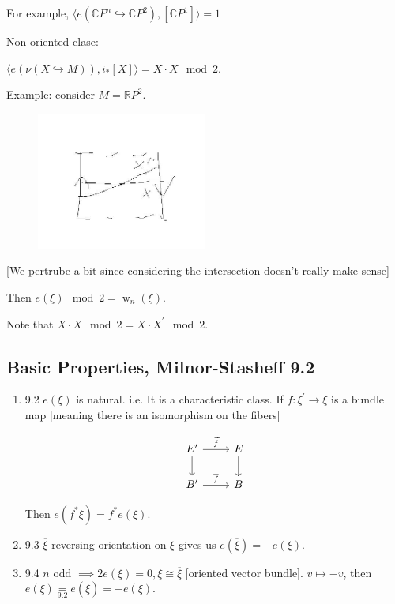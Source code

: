 \documentclass{article}
\theoremstyle{definition}
\begin{document}
    For example, \(\langle e(\mathbb{C} P^n \hookrightarrow \mathbb{C} P^2), [\mathbb{C} P^1] \rangle = 1\) 

    Non-oriented clase:

    \(\langle e(\nu (X \hookrightarrow M)), i_{\ast}[X] \rangle = X \cdot X \mod 2\).

    Example: consider \(M = \mathbb{R} P^2\).
    
    \begin{figure}[H]
        \centering
        \includegraphics[width=0.5\textwidth]{img/nonorientedcase}
    \end{figure}

    [We pertrube a bit since considering the intersection doesn't really make sense]
    
    Then \(e(\xi) \mod 2 = \operatorname{w}_n(\xi)\).

    Note that \(X \cdot X \mod  2 = X \cdot X^{\prime} \mod 2\).

    \subsection*{Basic Properties, Milnor-Stasheff 9.2}

    \begin{enumerate}[label=\roman*)]
        \item 9.2 \(e(\xi)\) is natural. i.e. It is a characteristic class. If \(f: \xi^{\prime} \to \xi\) is a bundle map [meaning there is an isomorphism on the fibers]
        
        \[
            \begin{tikzcd}
                E^{\prime} \ar[r,"\widetilde{f}"] \ar[d] & E \ar[d] \\ B^{\prime} \ar[r,"\overline{f}"] & B
            \end{tikzcd}
        \]

        Then \(e(f^{\ast} \xi) = f^{\ast} e(\xi)\).

        \item 9.3 \(\overline{\xi}\) reversing orientation on \(\xi\) gives us \(e(\overline{\xi}) = - e(\xi)\).
        \item 9.4 \(n\) odd \(\implies 2 e(\xi) = 0, \xi \cong \overline{\xi}\) [oriented vector bundle]. \(v \mapsto -v\), then \(e(\xi) \underset{9.2}{=} e(\overline{\xi }) = -e(\xi)\).  
    \end{enumerate} 
\end{document}
